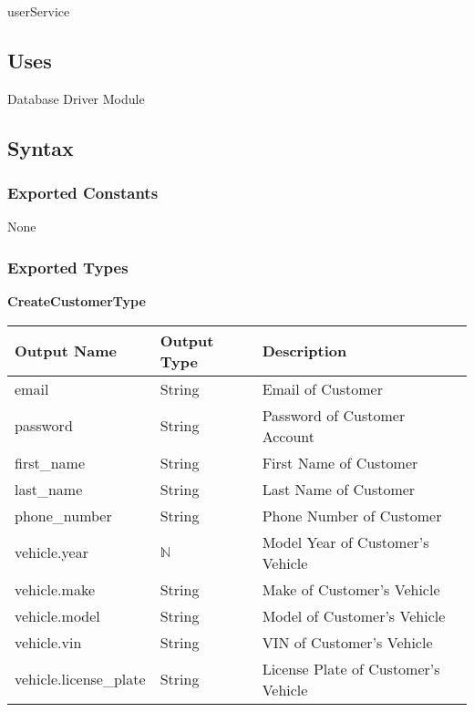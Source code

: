 \documentclass[12pt, titlepage]{article}
\begin{document}
userService

\subsection{Uses}

Database Driver Module

\subsection{Syntax}

\subsubsection{Exported Constants}

None

\subsubsection{Exported Types}

\textbf{CreateCustomerType}

\begin{table}[H]
	\begin{tabular}{|p{}|p{}|p{}|}
		\hline
		\textbf{Output Name}   & \textbf{Output Type} & \textbf{Description}                \\
		\hline
		email                  & String               & Email of Customer                   \\
		\hline
		password               & String               & Password of Customer Account        \\
		\hline
		first\_name            & String               & First Name of Customer              \\
		\hline
		last\_name             & String               & Last Name of Customer               \\
		\hline
		phone\_number          & String               & Phone Number of Customer            \\
		\hline
		vehicle.year           & $\mathbb{N}$         & Model Year of Customer's Vehicle    \\
		\hline
		vehicle.make           & String               & Make of Customer's Vehicle          \\
		\hline
		vehicle.model          & String               & Model of Customer's Vehicle         \\
		\hline
		vehicle.vin            & String               & VIN of Customer's Vehicle           \\
		\hline
		vehicle.license\_plate & String               & License Plate of Customer's Vehicle \\
		\hline
	\end{tabular}
\end{table}
\end{document}
